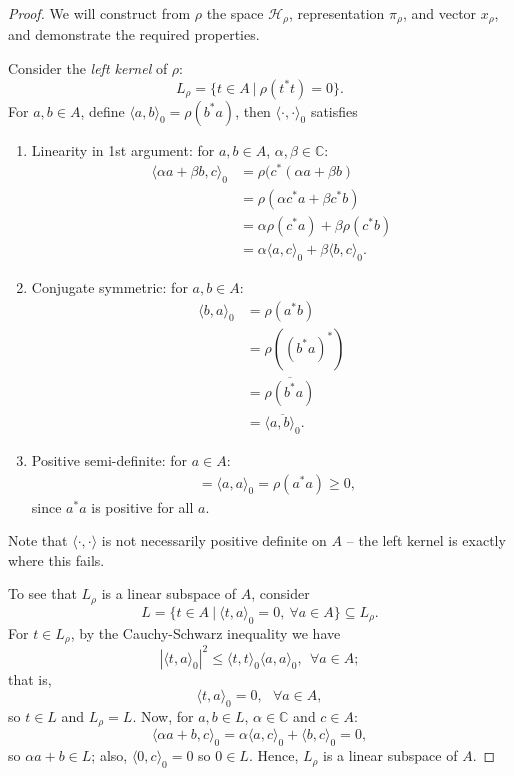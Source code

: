 \documentclass[12pt,a4paper]{report}
\theoremstyle{plain}
\theoremstyle{definition}
\newcommand{\1}{\mathbbm{1}}
\newcommand{\Hr}{\mathcal{H}_\rho}
\begin{document}
\begin{proof}
	We will construct from $\rho$ the space $\Hr$,  representation $\pi_\rho$, 
	and vector $x_\rho$, and demonstrate the required properties.
	
	Consider the \emph{left kernel} of $\rho$:
	\[
		L_\rho = \{t \in A ~|~ \rho (t ^\ast t) = 0 \}.
	\]	
	For $a,b \in A$, define $\langle a , b \rangle_0 = \rho(b^\ast a)$, then $\langle \cdot, \cdot \rangle_0$ satisfies
	\begin{enumerate}
	  \item Linearity in 1st argument: for $a,b\in A$, $\alpha, \beta \in \mathbb{C}$:
		\begin{align*}
		   \langle \alpha a + \beta b, c \rangle_0 
		&= \rho (c^\ast(\alpha a + \beta b)   								\\
		&= \rho (\alpha c^\ast a + \beta c^\ast b)  						\\
		&= \alpha \rho (c^\ast a) + \beta \rho (c^\ast b)					\\
		&= \alpha \langle a , c \rangle_0 + \beta \langle b, c \rangle_0.
		\end{align*}
	  \item Conjugate symmetric: for $a,b \in A$:
	  	\begin{align*}
	  	   \langle b,a \rangle _0 
	  	&= \rho (a^\ast b)													\\
	  	&= \rho ((b^\ast a)^\ast)											\\
	  	&= \overline{\rho (b^\ast a)}										\\
	  	&= \overline{\langle a,b \rangle _0 }.
	  	\end{align*}
	  \item Positive semi-definite: for $a \in A$:
	  	\begin{align*}
	  	&=	\langle a,a\rangle_0 = \rho(a^\ast a) \geq 0,
	  	\end{align*}
	  	since $a^\ast a$ is positive for all $a$. %
	\end{enumerate}
	Note that $\langle \cdot, \cdot \rangle$ is not necessarily positive definite on 
	$A$ -- the left kernel is exactly where this fails.
	
	To see that $L_\rho$ is a linear subspace of $A$, consider 
	\[
		L= \{t \in A  ~|~ \langle t,a \rangle _0 = 0, ~\forall a \in A \}\subseteq L_\rho.
	\]
	For $t \in L_\rho$, by the Cauchy-Schwarz inequality we have 
	\[ 
		|\langle t,a \rangle_0|^2 \leq \langle t,t \rangle_0 \langle a,a\rangle_0,~~ \forall a \in A;
	\]
	that is,
	\[
		\langle t,a \rangle _0 = 0, ~~~ \forall a \in A,
	\]
	so $t\in L$ and $L_\rho =L$.
	Now, for $a,b \in L$, $\alpha \in \mathbb{C}$ and $c \in A$:
	\[
		\langle \alpha a + b, c \rangle _0 = \alpha \langle a,c \rangle _0 + 
						\langle b,c\rangle _0 = 0,
	\]
	so $\alpha a +b \in L$; also, $\langle 0,c\rangle _0 = 0$ so $0 \in L$. 
	Hence, $L_\rho  $ is a linear subspace of $A$.
	

\end{proof}
\end{document}
